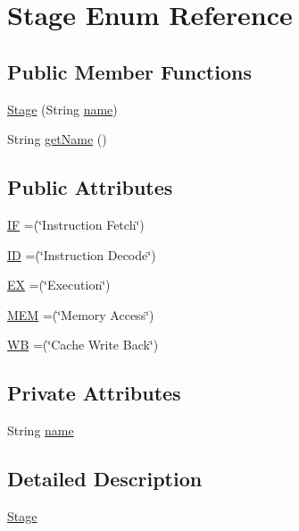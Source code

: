 \hypertarget{enum_stage}{}\section{Stage Enum Reference}
\label{enum_stage}
\subsection*{Public Member Functions}
\begin{DoxyCompactItemize}
\item 
\mbox{\hyperlink{enum_stage_a257d36473edc4c48949d9ad372ac078b}{Stage}} (String \mbox{\hyperlink{enum_stage_af32f9e7d7f90f13fd25b01dccbc49cb0}{name}})
\item 
String \mbox{\hyperlink{enum_stage_aed7fc998a53b35079ed2ff1aef363ec5}{get\+Name}} ()
\end{DoxyCompactItemize}
\subsection*{Public Attributes}
\begin{DoxyCompactItemize}
\item 
\mbox{\hyperlink{enum_stage_aeffba6edad8f19fb7f9a4d8acf9c5a7b}{IF}} =(\char`\"{}Instruction Fetch\char`\"{})
\item 
\mbox{\hyperlink{enum_stage_a90caf5b774c79ea44ca5633fd8206453}{ID}} =(\char`\"{}Instruction Decode\char`\"{})
\item 
\mbox{\hyperlink{enum_stage_aeda45a1236f43fc0e106bb52ea327611}{EX}} =(\char`\"{}Execution\char`\"{})
\item 
\mbox{\hyperlink{enum_stage_a9f5ca32ff09a37d81d80d1298350a57d}{M\+EM}} =(\char`\"{}Memory Access\char`\"{})
\item 
\mbox{\hyperlink{enum_stage_af6726871c185b151ca9747f844e71b9c}{WB}} =(\char`\"{}Cache Write Back\char`\"{})
\end{DoxyCompactItemize}
\subsection*{Private Attributes}
\begin{DoxyCompactItemize}
\item 
String \mbox{\hyperlink{enum_stage_af32f9e7d7f90f13fd25b01dccbc49cb0}{name}}
\end{DoxyCompactItemize}


\subsection{Detailed Description}
\mbox{\hyperlink{enum_stage}{Stage}}

